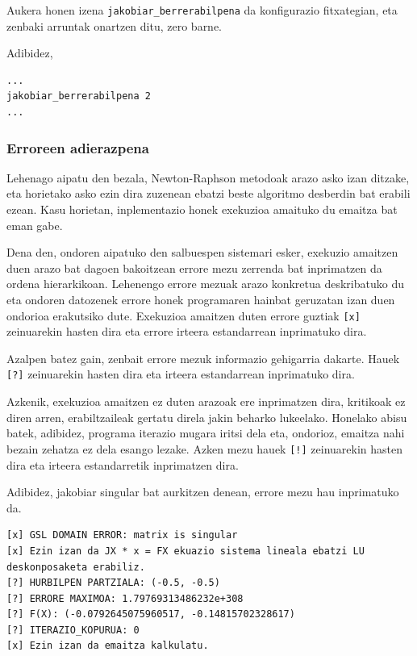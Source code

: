\documentclass[10pt,a4paper,basque]{article}
\begin{document}
Aukera honen izena \verb|jakobiar_berrerabilpena| da konfigurazio fitxategian, eta zenbaki arruntak onartzen ditu, zero barne.

Adibidez,

\begin{lstlisting}
...
jakobiar_berrerabilpena 2
...
\end{lstlisting}

\subsubsection{Erroreen adierazpena}

Lehenago aipatu den bezala, Newton-Raphson metodoak arazo asko izan ditzake, eta horietako asko ezin dira zuzenean ebatzi beste algoritmo desberdin bat erabili ezean. Kasu horietan, inplementazio honek exekuzioa amaituko du emaitza bat eman gabe.

Dena den, ondoren aipatuko den salbuespen sistemari esker, exekuzio amaitzen duen arazo bat dagoen bakoitzean errore mezu zerrenda bat inprimatzen da ordena hierarkikoan. Lehenengo errore mezuak arazo konkretua deskribatuko du eta ondoren datozenek errore honek programaren hainbat geruzatan izan duen ondorioa erakutsiko dute. Exekuzioa amaitzen duten errore guztiak \verb|[x]| zeinuarekin hasten dira eta errore irteera estandarrean inprimatuko dira.

Azalpen batez gain, zenbait errore mezuk informazio gehigarria dakarte. Hauek \verb|[?]| zeinuarekin hasten dira eta irteera estandarrean inprimatuko dira.

Azkenik, exekuzioa amaitzen ez duten arazoak ere inprimatzen dira, kritikoak ez diren arren, erabiltzaileak gertatu direla jakin beharko lukeelako. Honelako abisu batek, adibidez, programa iterazio mugara iritsi dela eta, ondorioz, emaitza nahi bezain zehatza ez dela esango lezake. Azken mezu hauek \verb|[!]| zeinuarekin hasten dira eta irteera estandarretik inprimatzen dira.

Adibidez, jakobiar singular bat aurkitzen denean, errore mezu hau inprimatuko da.

\begin{lstlisting}
[x] GSL DOMAIN ERROR: matrix is singular
[x] Ezin izan da JX * x = FX ekuazio sistema lineala ebatzi LU deskonposaketa erabiliz.
[?] HURBILPEN PARTZIALA: (-0.5, -0.5)
[?] ERRORE MAXIMOA: 1.79769313486232e+308
[?] F(X): (-0.0792645075960517, -0.14815702328617)
[?] ITERAZIO_KOPURUA: 0
[x] Ezin izan da emaitza kalkulatu.
\end{lstlisting}
\end{document}
